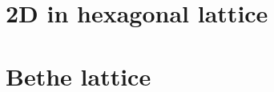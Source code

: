 








\section{2D in hexagonal lattice}


\section{Bethe lattice}\label{sec:bethelattice}







